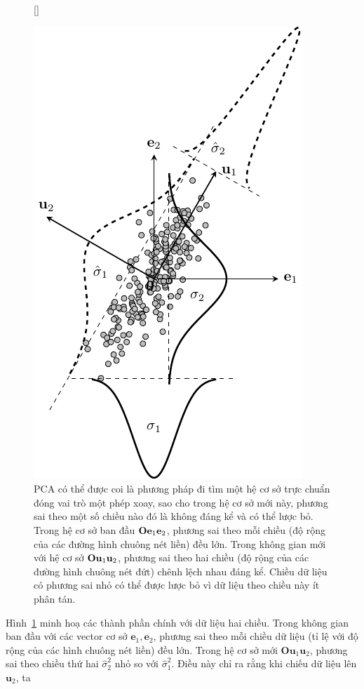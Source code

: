 \begin{figure}[t]


    [\FBwidth]
    {\caption{ PCA có thể được coi là phương pháp đi tìm một hệ cơ sở trực chuẩn
            đóng vai trò một phép xoay, sao cho trong hệ cơ sở mới này, phương sai theo
            một số chiều nào đó là không đáng kể và có thể lược bỏ. Trong hệ cơ sở ban đầu
            $\mathbf{O}\mathbf{e}_1\mathbf{e}_2$, phương sai theo mỗi chiều (độ rộng của các đường
            hình chuông nét liền) đều lớn. Trong không gian mới với hệ cơ sở
            $\mathbf{O}\mathbf{u}_1\mathbf{u}_2$, phương sai theo hai chiều (độ rộng của các đường
            hình chuông nét đứt) chênh lệch nhau đáng kể. Chiều dữ liệu có phương sai nhỏ
            có thể được lược bỏ vì dữ liệu theo chiều này ít phân tán. }
        \label{fig:27_4}}
    { %

        \includegraphics[width=.4\textwidth]{Chapters/07_DimemsionalityReduction/27_pca/latex/pca_var.pdf}
    }
\end{figure}
Hình~\ref{fig:27_4} minh hoạ các thành phần chính với dữ liệu hai chiều.
Trong không gian ban đầu với các vector cơ sở $\mathbf{e}_1,
    \mathbf{e}_2$, phương sai theo mỗi chiều dữ liệu (tỉ lệ với độ rộng của các hình chuông
nét liền) đều lớn. Trong hệ cơ sở mới $\mathbf{O}\mathbf{u}_1\mathbf{u}_2$,
phương sai theo chiều thứ hai $\hat{\sigma}_2^2$ nhỏ so với
$\hat{\sigma}_1^2$. Điều này chỉ ra rằng khi chiếu dữ liệu lên $\mathbf{u}_2$, ta
